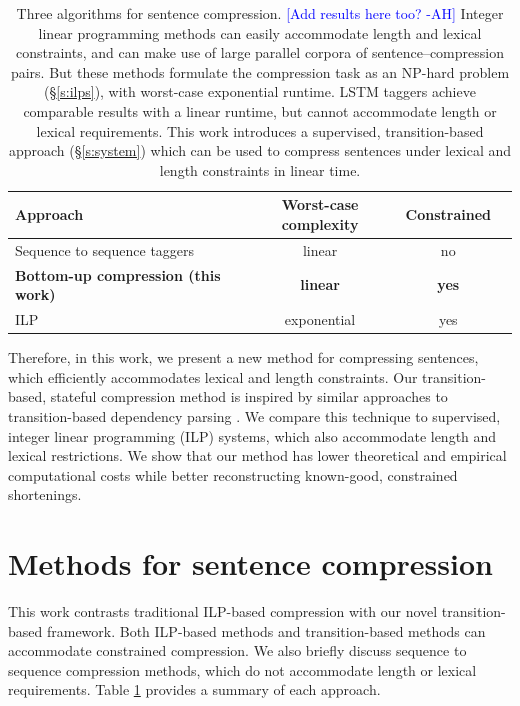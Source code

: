 \documentclass[11pt,a4paper]{article}
\newcommand{\ahcomment}[1]{\textcolor{blue}{[#1 -AH]}}
\begin{document}
\begin{table}[htb!]
\begin{tabular}{lccc}
\textbf{Approach} & \textbf{Worst-case complexity} & \textbf{Constrained}  \\ \hline
Sequence to sequence taggers \cite{filippova2015sentence}   & linear              & no         \\   
\textbf{Bottom-up compression (this work)}  & \textbf{linear}     &      \textbf{yes}   \\
ILP    \cite{filippova2013overcoming,Wang2017CanSH}       &   exponential    & yes      \\
\end{tabular}
\caption{Three algorithms for sentence compression. \ahcomment{Add results here too?} Integer linear programming methods \cite{clarke2008global,filippova2013overcoming,Wang2017CanSH} can easily accommodate length and lexical constraints, and can make use of large parallel corpora of sentence--compression pairs. But these methods formulate the compression task as an NP-hard problem (\S\ref{s:ilps}), with worst-case exponential runtime. LSTM taggers \cite{filippova2015sentence} achieve comparable results with a linear runtime, but cannot accommodate length or lexical requirements. This work introduces a supervised, transition-based approach (\S\ref{s:system}) which can be used to compress sentences under lexical and length constraints in linear time.} 
\label{t:algos}
\end{table}


Therefore, in this work, we present a new method for compressing sentences, which efficiently accommodates lexical and length constraints. Our transition-based, stateful compression method is inspired by similar approaches to transition-based dependency parsing \cite{nivre2003,D14-1082}. We compare this technique to supervised, integer linear programming (ILP) systems, which also accommodate length and lexical restrictions. We show that our method has lower theoretical and empirical computational costs while better reconstructing known-good, constrained shortenings. 

\section{Methods for sentence compression}

This work contrasts traditional ILP-based compression with our novel transition-based framework. Both ILP-based methods and transition-based methods can accommodate constrained compression. We also briefly discuss sequence to sequence compression methods, which do not accommodate length or lexical requirements. Table \ref{t:algos} provides a summary of each approach.
\end{document}
